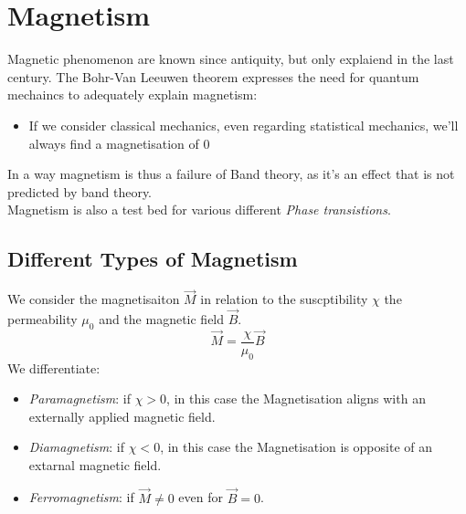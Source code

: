 \documentclass{report}
\begin{document}
\chapter{Magnetism}
Magnetic phenomenon are known since antiquity, but only explaiend in the last century.
The Bohr-Van Leeuwen theorem expresses the need for quantum mechaincs to adequately explain magnetism:
\begin{itemize}
	\item If we consider classical mechanics, even regarding statistical mechanics, we'll always find a magnetisation of $0$
\end{itemize}
In a way magnetism is thus a failure of Band theory, as it's an effect that is not predicted by band theory. \\
Magnetism is also a test bed for various different \emph{Phase transistions}.\\
\section{Different Types of Magnetism}
We consider the magnetisaiton $\vec{M}$ in relation to the suscptibility $\chi$ the permeability $\mu_0$ and the magnetic field $\vec{B}$. \[
\vec{M} = \frac{\chi}{\mu_0}\vec{B}
\]
We differentiate:
\begin{itemize}
	\item \emph{Paramagnetism}: if $\chi > 0$, in this case the Magnetisation aligns with an externally applied magnetic field.
	\item \emph{Diamagnetism}: if $\chi < 0$, in this case the Magnetisation is opposite of an extarnal magnetic field.
	\item \emph{Ferromagnetism}:  if $\vec{M} \neq 0$ even for $\vec{B} = 0$.
\end{itemize}
\end{document}
